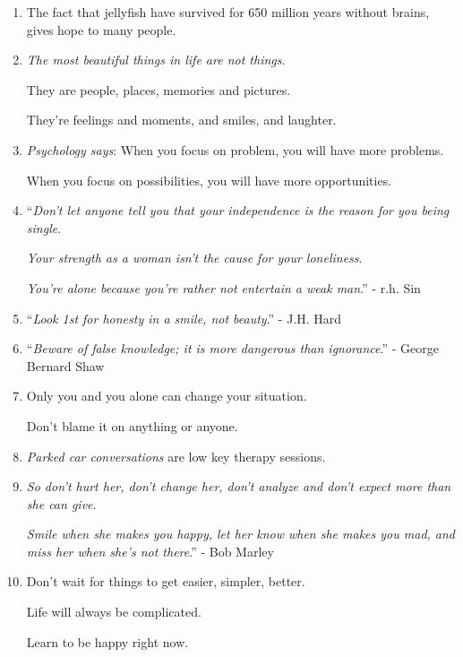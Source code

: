 \documentclass{article}
\numberwithin{equation}{section}
\begin{document}
\begin{enumerate}
    Happiness is free!
    \item The fact that jellyfish have survived for 650 million years without brains, gives hope to many people.
    \item \textit{The most beautiful things in life are not things}.
    
    They are people, places, memories and pictures.
    
    They're feelings and moments, and smiles, and laughter.
    \item \textit{Psychology says}: When you focus on problem, you will have more problems.
    
    When you focus on possibilities, you will have more opportunities.
    \item ``\textit{Don't let anyone tell you that your independence is the reason for you being single}.
    
    \textit{Your strength as a woman isn't the cause for your loneliness}.
    
    \textit{You're alone because you're rather not entertain a weak man}.'' - r.h. Sin
    \item ``\textit{Look 1st for honesty in a smile, not beauty}.'' - J.H. Hard
    \item ``\textit{Beware of false knowledge; it is more dangerous than ignorance}.'' - George Bernard Shaw
    \item Only you and you alone can change your situation.
    
    Don't blame it on anything or anyone.
    \item \textit{Parked car conversations} are low key therapy sessions.
    \item \textit{So don't hurt her, don't change her, don't analyze and don't expect more than she can give}.
    
    \textit{Smile when she makes you happy, let her know when she makes you mad, and miss her when she's not there}.'' - Bob Marley
    \item Don't wait for things to get easier, simpler, better.
    
    Life will always be complicated.
    
    Learn to be happy right now.
    

\end{enumerate}
\end{document}

